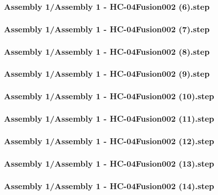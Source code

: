 \documentclass[a4paper,12pt]{article}
\begin{document}
\subsubsection{Assembly 1/Assembly 1 - HC-04Fusion002 (6).step}

\subsubsection{Assembly 1/Assembly 1 - HC-04Fusion002 (7).step}

\subsubsection{Assembly 1/Assembly 1 - HC-04Fusion002 (8).step}

\subsubsection{Assembly 1/Assembly 1 - HC-04Fusion002 (9).step}

\subsubsection{Assembly 1/Assembly 1 - HC-04Fusion002 (10).step}

\subsubsection{Assembly 1/Assembly 1 - HC-04Fusion002 (11).step}

\subsubsection{Assembly 1/Assembly 1 - HC-04Fusion002 (12).step}

\subsubsection{Assembly 1/Assembly 1 - HC-04Fusion002 (13).step}

\subsubsection{Assembly 1/Assembly 1 - HC-04Fusion002 (14).step}

\end{document}
